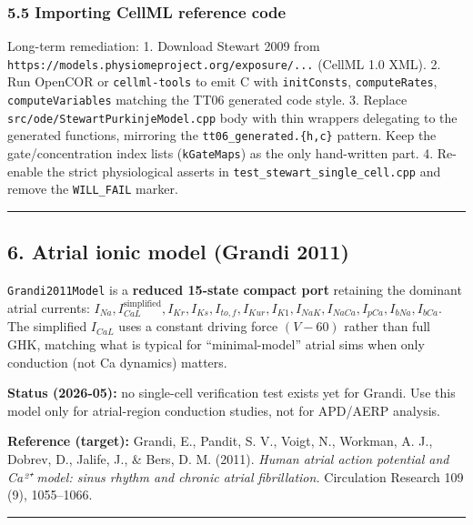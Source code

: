 \documentclass[
  11pt,
]{article}
\begin{document}
\hypertarget{importing-cellml-reference-code}{%
\subsubsection{5.5 Importing CellML reference
code}\label{importing-cellml-reference-code}}

Long-term remediation: 1. Download Stewart 2009 from
\texttt{https://models.physiomeproject.org/exposure/...} (CellML 1.0
XML). 2. Run OpenCOR or \texttt{cellml-tools} to emit C with
\texttt{initConsts}, \texttt{computeRates}, \texttt{computeVariables}
matching the TT06 generated code style. 3. Replace
\texttt{src/ode/StewartPurkinjeModel.cpp} body with thin wrappers
delegating to the generated functions, mirroring the
\texttt{tt06\_generated.\{h,c\}} pattern. Keep the gate/concentration
index lists (\texttt{kGateMaps}) as the only hand-written part. 4.
Re-enable the strict physiological asserts in
\texttt{test\_stewart\_single\_cell.cpp} and remove the
\texttt{WILL\_FAIL} marker.

\begin{center}\rule{0.5\linewidth}{0.5pt}\end{center}

\hypertarget{atrial-ionic-model-grandi-2011}{%
\subsection{6. Atrial ionic model (Grandi
2011)}\label{atrial-ionic-model-grandi-2011}}

\texttt{Grandi2011Model} is a \textbf{reduced 15-state compact port}
retaining the dominant atrial currents:
\(I_{Na}, I_{CaL}^\mathrm{simplified}, I_{Kr}, I_{Ks}, I_{to,f}, I_{Kur}, I_{K1}, I_{NaK}, I_{NaCa}, I_{pCa}, I_{bNa}, I_{bCa}\).
The simplified \(I_{CaL}\) uses a constant driving force \((V - 60)\)
rather than full GHK, matching what is typical for ``minimal-model''
atrial sims when only conduction (not Ca dynamics) matters.

\textbf{Status (2026-05):} no single-cell verification test exists yet
for Grandi. Use this model only for atrial-region conduction studies,
not for APD/AERP analysis.

\textbf{Reference (target):} Grandi, E., Pandit, S. V., Voigt, N.,
Workman, A. J., Dobrev, D., Jalife, J., \& Bers, D. M. (2011).
\emph{Human atrial action potential and Ca²⁺ model: sinus rhythm and
chronic atrial fibrillation.} Circulation Research 109 (9), 1055--1066.

\begin{center}\rule{0.5\linewidth}{0.5pt}\end{center}
\end{document}
